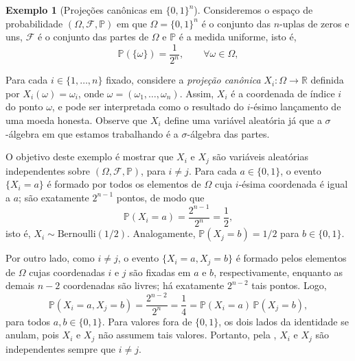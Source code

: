 \documentclass[12pt,portuguese]{article}
\theoremstyle{definition}
\newtheorem{example}[example]{Exemplo}
\begin{document}
\begin{example}[Projeções canônicas em $\{0,1\}^n$]\label{ex:projecoes-canonicas}
Consideremos o espaço de probabilidade $(\Omega,\mathscr{F},\mathbb{P})$ em que
$\Omega = \{0,1\}^n$ é o conjunto das $n$-uplas de zeros e uns,
$\mathscr{F}$ é o conjunto das partes de $\Omega$ e $\mathbb{P}$ é a medida
uniforme, isto é, 
\[
\mathbb{P}(\{\omega\}) = \frac{1}{2^{n}}, \qquad \forall \omega \in \Omega,
\]

Para cada $i \in \{1, \ldots, n\}$ fixado, considere a
\emph{projeção canônica} $X_i : \Omega \to \mathbb{R}$ definida por
$X_i(\omega) = \omega_i$, onde $\omega = (\omega_1, \ldots, \omega_n)$.
Assim, $X_i$ é a coordenada de índice $i$ do ponto $\omega$, e pode ser
interpretada como o resultado do $i$-ésimo lançamento de uma moeda honesta.
Observe que $X_i$ define uma variável aleatória já que a $\sigma$-álgebra
em que estamos trabalhando é a $\sigma$-álgebra das partes. 

O objetivo deste exemplo é mostrar que $X_i$ e $X_j$ são variáveis aleatórias 
independentes sobre $(\Omega,\mathscr{F},\mathbb{P})$, para $i \neq j$. Para cada
$a \in \{0,1\}$, o evento $\{X_i = a\}$ é formado por todos os elementos de
$\Omega$ cuja $i$-ésima coordenada é igual a $a$; são exatamente $2^{n-1}$
pontos, de modo que
\[
\mathbb{P}(X_i = a) = \frac{2^{n-1}}{2^n} = \frac{1}{2},
\]
isto é, $X_i \sim \mathrm{Bernoulli}(1/2)$. Analogamente,
$\mathbb{P}(X_j = b) = 1/2$ para $b \in \{0,1\}$.

Por outro lado, como $i \neq j$, o evento $\{X_i = a, X_j = b\}$ é formado
pelos elementos de $\Omega$ cujas coordenadas $i$ e $j$ são fixadas em $a$ e
$b$, respectivamente, enquanto as demais $n-2$ coordenadas são livres; há
exatamente $2^{n-2}$ tais pontos. Logo,
\[
\mathbb{P}(X_i = a, X_j = b)
= \frac{2^{n-2}}{2^n}
= \frac{1}{4}
= \mathbb{P}(X_i = a)\,\mathbb{P}(X_j = b),
\]
para todos $a, b \in \{0,1\}$. Para valores fora de $\{0,1\}$, os dois lados
da identidade se anulam, pois $X_i$ e $X_j$ não assumem tais valores.
Portanto, pela , $X_i$ e $X_j$ são
independentes sempre que $i \neq j$.
\end{example}
\end{document}
